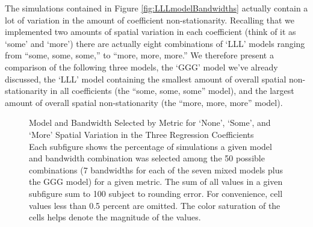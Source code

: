 \documentclass{article}\usepackage[]{graphicx}\usepackage[]{color}
\begin{document}
The simulations contained in Figure \ref{fig:LLLmodelBandwidths} actually contain a lot of variation in the amount of coefficient non-stationarity. Recalling that we implemented two amounts of spatial variation in each coefficient (think of it as `some' and `more') there are actually eight combinations of `LLL' models ranging from ``some, some, some,'' to ``more, more, more.'' We therefore present a comparison of the following three models, the `GGG' model we've already discussed, the `LLL' model containing the smallest amount of overall spatial non-stationarity in all coefficients (the ``some, some, some'' model), and the largest amount of overall spatial non-stationarity (the ``more, more, more'' model).




\begin{figure}
\caption{Model and Bandwidth Selected by Metric for `None', `Some', and `More' Spatial Variation in the Three Regression Coefficients \\ Each subfigure shows the percentage of simulations a given model and bandwidth combination was selected among the 50 possible combinations (7 bandwidths for each of the seven mixed models plus the GGG model) for a given metric. The sum of all values in a given subfigure sum to 100 subject to rounding error. For convenience, cell values less than 0.5 percent are omitted. The color saturation of the cells helps denote the magnitude of the values.}
\label{fig:GGG2LLLmodelBandwidths}
\end{figure}
\end{document}
